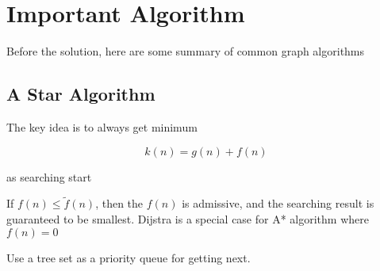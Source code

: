 \section{Important Algorithm}

Before the solution, here are some summary of common graph algorithms

\subsection{A Star Algorithm}

The key idea is to always get minimum

\begin{equation}
  k(n) = g(n) + f(n)
\end{equation}

as searching start

If $f(n) \leq \tilde{f}(n)$, then the $f(n)$ is admissive, and the searching result is guaranteed to be smallest. Dijstra is a special case for A* algorithm where $f(n) = 0$

Use a tree set as a priority queue for getting next.

